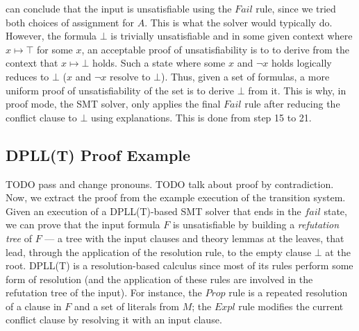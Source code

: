 \documentclass[11pt]{article}
\begin{document}
	can conclude that the input is 
	unsatisfiable using the $\mathit{Fail}$ rule, 
	since we tried both choices of 
	assignment for $A$. This is what 
	the solver would typically do. However, 
	the formula $\bot$ 
	is trivially unsatisfiable and in 
	some given context where 
	$x \mapsto \top$ for some $x$, an 
	acceptable proof of unsatisfiability 
	is to to derive from the context that 
	$x \mapsto \bot$ holds. Such a state 
	where some $x$ and $\neg x$ holds
	logically reduces to $\bot$ 
	($x$ and $\neg x$ resolve to $\bot$).
	Thus, given a set of formulas,
	a more uniform proof of 
	unsatisfiability of the set is 
	to derive $\bot$ from it. This is why, 
	in proof mode, the SMT solver, only 
	applies the final $\mathit{Fail}$ rule after 
	reducing the conflict clause to $\bot$
	using explanations. This is done 
	from step 15 to 21.
	
	\subsection{DPLL(T) Proof Example}
	\label{sec:proofex}
	TODO pass and change pronouns. TODO talk about proof by contradiction.
	Now, we extract the proof from the 
	example execution of the transition system.
	Given an execution of a DPLL(T)-based 
	SMT solver that ends in the $fail$ state, 
	we can prove that the input formula 
	$F$ is unsatisfiable by building a 
	\textit{refutation tree} of $F$ --- a 
	tree with the input clauses 
	and theory lemmas at the leaves, 
	that lead, through the application of 
	the resolution rule, to the empty 
	clause $\bot$ at the root. DPLL(T) is 
	a resolution-based calculus since most 
	of its rules perform some form of 
	resolution (and the application of 
	these rules are involved in the 
	refutation tree of the input). For 
	instance, the $\mathit{Prop}$ rule is a 
	repeated resolution of a clause in 
	$F$ and a set of literals from $M$; 
	the $\mathit{Expl}$ rule modifies the current 
	conflict clause by resolving it with 
	an input clause.
	
\end{document}

